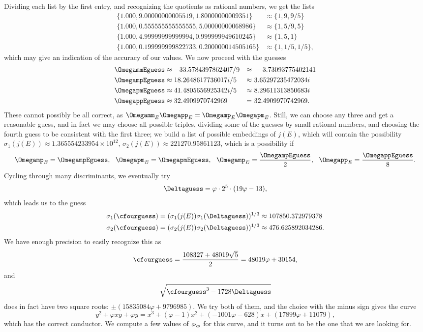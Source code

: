 \documentclass{amsart}
\begin{document}
Dividing each list by the first entry, and recognizing the quotients as rational
numbers, we get the lists
\[
\begin{split}
       \{1.000, 9.00000000005519, 1.80000000009351\}  &\approx \{1, 9, 9/5\}\\
       \{1.000, 0.555555555555555, 5.00000000068986 \} &\approx \{1, 5/9, 5\}\\
       \{1.000, 4.99999999999994, 0.999999949610245 \}  &\approx \{1, 5, 1\} \\ 
       \{1.000, 0.199999999822733, 0.200000014505165 \} &\approx \{1, 1/5, 1/5\},
\end{split}
\]
which may give an indication of the accuracy of our values. We now proceed with
the guesses
\begin{align*}
\phantom{MMMMM} \OmegammEguess &\approx -33.5784397862407/9 &\approx&\  -3.73093775402141 \phantom{MMMMM} \\
    \OmegampEguess &\approx 18.2648617736017i/5 &\approx&\  3.65297235472034i \\
    \OmegapmEguess &\approx 41.4805656925342i/5 &\approx&\  8.29611313850683i \\
    \OmegappEguess &\approx 32.4909970742969    &=&\  32.4909970742969.
\end{align*}
These cannot possibly be all correct, as $\Omegamm_E \Omegapp_E = \Omegamp_E \Omegapm_E$.
Still, we can choose any three and get a reasonable guess, and in fact we may choose all
possible triples, dividing some of the guesses by small rational numbers, and choosing the
fourth guess to be consistent with the first three; we build a list of possible embeddings
of $j(E)$, which will contain the possibility $\sigma_1(j(E)) \approx 1.365554233954 \times 10^{12}$,
$\sigma_2(j(E)) \approx 221270.95861123$, which is a possibility if 
\[\Omegamp_E = \OmegampEguess,\ \ 
\Omegapm_E = \OmegapmEguess,\ \ \Omegamp_E = \frac{\OmegampEguess}{2},\ \ \Omegapp_E = \frac{\OmegappEguess}{8}.\]
Cycling through many discriminants, we eventually try
\[
    \Deltaguess = \varphi \cdot 2^5 \cdot (19\varphi - 13),
\]
which leads us to the guess
\begin{align*}
    \sigma_1(\cfourguess) &= (\sigma_1(j(E)) \sigma_1(\Deltaguess))^{1/3} \approx 107850.372979378 \\
    \sigma_2(\cfourguess) &= (\sigma_2(j(E)) \sigma_2(\Deltaguess))^{1/3} \approx 476.625892034286.
\end{align*}
We have enough precision to easily recognize this as
\[
    \cfourguess = \frac{108327 + 48019 \sqrt5}{2} = 48019\varphi + 30154,
\]
and
\[
    \sqrt{\cfourguess^3 - 1728\Deltaguess}
\]
does in fact have two square roots: $\pm(15835084\varphi + 9796985)$. We try both of them, and
the choice with the minus sign gives the curve
\[
y^2 + \varphi xy + \varphi y = x^3 + \left(\varphi - 1\right)x^2 + \left(-1001 \varphi - 628\right)x + \left(17899 \varphi + 11079\right),
\]
which has the correct conductor. We compute a few values of $a_\p$ for this curve, and it turns
out to be the one that we are looking for.
\end{document}
